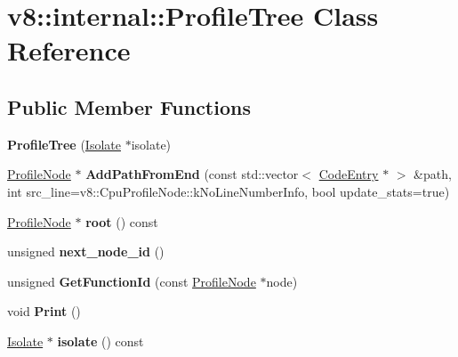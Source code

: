 \hypertarget{classv8_1_1internal_1_1_profile_tree}{}\section{v8\+:\+:internal\+:\+:Profile\+Tree Class Reference}
\label{classv8_1_1internal_1_1_profile_tree}
\subsection*{Public Member Functions}
\begin{DoxyCompactItemize}
\item 
{\bfseries Profile\+Tree} (\hyperlink{classv8_1_1internal_1_1_isolate}{Isolate} $\ast$isolate)\hypertarget{classv8_1_1internal_1_1_profile_tree_ad0a684dc116b33cae0283694e33af15f}{}\label{classv8_1_1internal_1_1_profile_tree_ad0a684dc116b33cae0283694e33af15f}

\item 
\hyperlink{classv8_1_1internal_1_1_profile_node}{Profile\+Node} $\ast$ {\bfseries Add\+Path\+From\+End} (const std\+::vector$<$ \hyperlink{classv8_1_1internal_1_1_code_entry}{Code\+Entry} $\ast$ $>$ \&path, int src\+\_\+line=v8\+::\+Cpu\+Profile\+Node\+::k\+No\+Line\+Number\+Info, bool update\+\_\+stats=true)\hypertarget{classv8_1_1internal_1_1_profile_tree_a249bc90bbae882f9d949ebcf25638c69}{}\label{classv8_1_1internal_1_1_profile_tree_a249bc90bbae882f9d949ebcf25638c69}

\item 
\hyperlink{classv8_1_1internal_1_1_profile_node}{Profile\+Node} $\ast$ {\bfseries root} () const \hypertarget{classv8_1_1internal_1_1_profile_tree_abd2b62dab12fa95dd77c7aa50922fe25}{}\label{classv8_1_1internal_1_1_profile_tree_abd2b62dab12fa95dd77c7aa50922fe25}

\item 
unsigned {\bfseries next\+\_\+node\+\_\+id} ()\hypertarget{classv8_1_1internal_1_1_profile_tree_a8f6da4826c203b27853dd938cc629afe}{}\label{classv8_1_1internal_1_1_profile_tree_a8f6da4826c203b27853dd938cc629afe}

\item 
unsigned {\bfseries Get\+Function\+Id} (const \hyperlink{classv8_1_1internal_1_1_profile_node}{Profile\+Node} $\ast$node)\hypertarget{classv8_1_1internal_1_1_profile_tree_a801fa3c6cdc6c8ade55b1e33284301a7}{}\label{classv8_1_1internal_1_1_profile_tree_a801fa3c6cdc6c8ade55b1e33284301a7}

\item 
void {\bfseries Print} ()\hypertarget{classv8_1_1internal_1_1_profile_tree_a8c898f6817801f67220153bfdba1c868}{}\label{classv8_1_1internal_1_1_profile_tree_a8c898f6817801f67220153bfdba1c868}

\item 
\hyperlink{classv8_1_1internal_1_1_isolate}{Isolate} $\ast$ {\bfseries isolate} () const \hypertarget{classv8_1_1internal_1_1_profile_tree_aad2b3eeb3acb4ec73b0c4f535fb3fc3d}{}\label{classv8_1_1internal_1_1_profile_tree_aad2b3eeb3acb4ec73b0c4f535fb3fc3d}

\end{DoxyCompactItemize}
